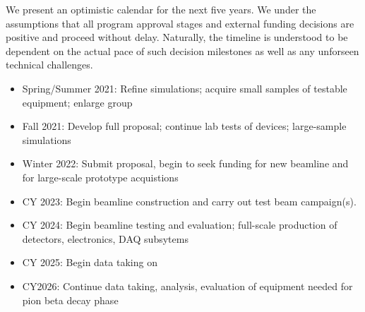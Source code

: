 We present an optimistic calendar for the next five years.  We under the assumptions that all program approval stages and external funding decisions are positive and proceed without delay.  Naturally, the timeline is understood to be dependent on the actual pace of such decision milestones as well as any unforseen technical challenges.
\begin{itemize}
\item Spring/Summer 2021:  Refine simulations;  acquire small samples of testable equipment;  enlarge group
\item Fall 2021:  Develop full proposal; continue lab tests of devices; large-sample simulations
\item Winter 2022:  Submit proposal, begin to seek funding for new beamline and for large-scale prototype acquistions
\item CY 2023:  Begin beamline construction and carry out test beam campaign(s).
\item CY 2024: Begin beamline testing and evaluation;  full-scale production of detectors, electronics, DAQ subsytems
\item CY 2025: Begin data taking on \nexp
\item CY2026: Continue data taking, analysis, evaluation of equipment needed for pion beta decay phase
\end{itemize} 